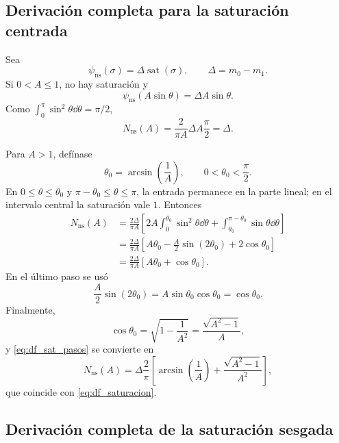\fi
\ifnum{}\relax
\subsection{Derivación completa para la saturación centrada}
\label{app:df_saturacion_centrada}

Sea
\[
\psi_{\mathrm{ns}}(\sigma)=\Delta\operatorname{sat}(\sigma),
\qquad \Delta=m_0-m_1.
\]
Si \(0<A\leq1\), no hay saturación y
\[
\psi_{\mathrm{ns}}(A\sin\theta)=\Delta A\sin\theta.
\]
Como \(\int_0^\pi\sin^2\theta\dd\theta=\pi/2\),
\[
N_{\mathrm{ns}}(A)
=\frac{2}{\pi A}\Delta A\frac{\pi}{2}
=\Delta.
\]

Para \(A>1\), defínase
\[
\theta_0=\arcsin\left(\frac1A\right),
\qquad 0<\theta_0<\frac{\pi}{2}.
\]
En \(0\leq\theta\leq\theta_0\) y
\(\pi-\theta_0\leq\theta\leq\pi\), la entrada permanece en la parte lineal;
en el intervalo central la saturación vale \(1\). Entonces
\begin{align}
N_{\mathrm{ns}}(A)
&=\frac{2\Delta}{\pi A}
\left[
2A\int_0^{\theta_0}\sin^2\theta\dd\theta
+\int_{\theta_0}^{\pi-\theta_0}\sin\theta\dd\theta
\right]\nonumber\\
&=\frac{2\Delta}{\pi A}
\left[
A\theta_0-\frac{A}{2}\sin(2\theta_0)
+2\cos\theta_0
\right]\nonumber\\
&=\frac{2\Delta}{\pi A}
\left[A\theta_0+\cos\theta_0\right].
\label{eq:df_sat_pasos}
\end{align}
En el último paso se usó
\[
\frac{A}{2}\sin(2\theta_0)
=A\sin\theta_0\cos\theta_0
=\cos\theta_0.
\]
Finalmente,
\[
\cos\theta_0
=\sqrt{1-\frac1{A^2}}
=\frac{\sqrt{A^2-1}}{A},
\]
y \cref{eq:df_sat_pasos} se convierte en
\[
N_{\mathrm{ns}}(A)
=\Delta\frac{2}{\pi}
\left[
\arcsin\left(\frac1A\right)
+\frac{\sqrt{A^2-1}}{A^2}
\right],
\]
que coincide con \cref{eq:df_saturacion}.

\fi
\ifnum{}\relax
\subsection{Derivación completa de la saturación sesgada}
\label{app:df_saturacion_sesgada}

